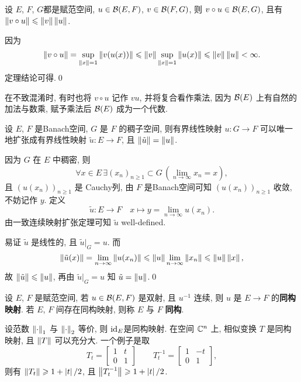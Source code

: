 	\begin{Theorem}
		 设 $ E $, $ F $, $ G $都是赋范空间,  $ u\in\mathcal{B}(E, F) $, $ v\in\mathcal{B}(F, G) $, 则 $ v\circ u\in\mathcal{B}(E, G) $, 且有 $ \left\| v\circ u \right\|\leqslant\left\| v \right\|\left\| u \right\| $.
	\end{Theorem}
	\begin{Proof}
		因为
		\[
			\left\| v\circ u \right\|=\sup_{\left\| x \right\|=1}\left\| v(u(x)) \right\|\leqslant\left\| v \right\|\sup_{\left\| x \right\|=1}\left\| u(x) \right\|\leqslant\left\| v \right\|\left\| u \right\|<\infty.
		\]
		定理结论可得.\qed
	\end{Proof}

	\begin{Remark}
		在不致混淆时, 有时也将 $ v\circ u $ 记作 $ vu $, 并将复合看作乘法, 因为 $ \mathcal{B}(E) $ 上有自然的加法与数乘, 赋予乘法后 $ \mathcal{B}(E) $ 成为一个代数.
	\end{Remark}

	\begin{Theorem}
		设 $ E $, $ F $ 是Banach空间,  $ G $ 是 $ F $ 的稠子空间, 则有界线性映射 $ u: G\to F $ 可以唯一地扩张成有界线性映射 $ \tilde{u}:E\to F $, 且 $ \left\| \tilde{u} \right\|=\left\| u \right\| $.
   \end{Theorem}
   \begin{Proof}
		因为 $ G $ 在 $ E $ 中稠密, 则
		\[
			\forall x\in E\,\exists(x_{n})_{n\geqslant1}\subset G\,(\lim_{n\to\infty}x_{n}=x),
		\]
		且 $ (u(x_{n}))_{n\geqslant1} $ 是 Cauchy列, 由 $ F $ 是Banach空间可知 $ (u(x_{n}))_{n\geqslant1} $ 收敛, 不妨记作 $ y $. 定义
		\[
			\tilde{u}: E\to F\quad x\mapsto y=\lim_{n\to\infty}u(x_{n}).
		\]
		由一致连续映射扩张定理可知 $ \tilde{u} $ well-defined.

		易证 $ \tilde{u} $ 是线性的, 且 $ \tilde{u}|_{G}=u $. 而
		\[
			\left\| \tilde{u}(x) \right\|=\lim_{n\to\infty}\left\| u(x_{n}) \right\|\leqslant\left\| u \right\|\lim_{n\to\infty}\left\| x_{n} \right\|\leqslant\left\| u \right\|\left\| x \right\|,
		\]
		故 $ \left\| \tilde{u} \right\|\leqslant\left\| u \right\| $, 再由 $ \tilde{u}|_{G}=u $ 知 $ \tilde{u}=\left\| u \right\| $.\qed
		
	\end{Proof}

	\begin{Definition}[同构]\label{def:同构}
		 设 $ E $, $ F $ 是赋范空间, 若 $ u\in\mathcal{B}(E, F) $ 是双射, 且 $ u^{-1} $ 连续, 则 $ u $ 是 $ E\to F $ 的\textbf{同构映射}. 若 $ E $, $ F $ 间存在同构映射, 则称 $ E $ 与 $ F $ \textbf{同构}.
	\end{Definition}

	\begin{Remark}
		设范数 $ \left\| \cdot \right\|_{1} $ 与 $ \left\| \cdot \right\|_{2} $ 等价, 则 $ \mathrm{id}_{E} $是同构映射. 在空间 $ \mathbb{C}^{n} $ 上, 相似变换 $ T $ 是同构映射, 且 $ \left\| T \right\| $ 可以充分大. 一个例子是取
		\[
			T_{t}=\begin{bmatrix}
				1 & t\\
				0 & 1
			\end{bmatrix}
			\qquad
			T_{t}^{-1}=\begin{bmatrix}
				1 & -t \\
				0 & 1
			\end{bmatrix},
		\]
		则有 $ \left\| T_{t} \right\|\geqslant1+\left| t \right| /2 $, 且 $ \left\| T_{t}^{-1} \right\|\geqslant 1+\left| t \right| /2 $.  
	\end{Remark}


